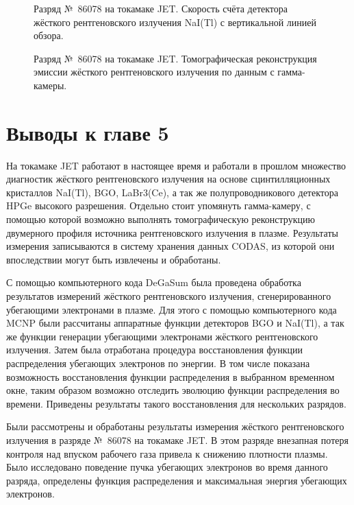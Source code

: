 \begin{figure}[ht!]
  \caption{ Разряд №~86078 на токамаке JET. Скорость счёта детектора жёсткого рентгеновского излучения NaI(Tl) с вертикальной линией обзора.~\cite{Plyusnin2015} }
  \label{fig:jetPulseHxrNaI86078}
\end{figure}

\begin{figure}[ht!]
  \caption{ Разряд №~86078 на токамаке JET. Томографическая реконструкция эмиссии жёсткого рентгеновского излучения по данным с гамма-камеры.~\cite{Plyusnin2015} }
  \label{fig:jetPulseHxrTomography86078}
\end{figure}



\FloatBarrier
\section{Выводы к главе 5}

На токамаке JET работают в настоящее время и работали в прошлом множество диагностик жёсткого рентгеновского излучения на основе сцинтилляционных кристаллов NaI(Tl), BGO, LaBr3(Ce), а так же полупроводникового детектора HPGe высокого разрешения. Отдельно стоит упомянуть гамма-камеру, с помощью которой возможно выполнять томографическую реконструкцию двумерного профиля источника рентгеновского излучения в плазме. Результаты измерения записываются в систему хранения данных CODAS, из которой они впоследствии могут быть извлечены и обработаны. 

С помощью компьютерного кода DeGaSum была проведена обработка результатов измерений жёсткого рентгеновского излучения, сгенерированного убегающими электронами в плазме. Для этого с помощью компьютерного кода MCNP были рассчитаны аппаратные функции детекторов BGO и NaI(Tl), а так же функции генерации убегающими электронами жёсткого рентгеновского излучения. Затем была отработана процедура восстановления функции распределения убегающих электронов по энергии. В том числе показана возможность восстановления функции распределения в выбранном временном окне, таким образом возможно отследить эволюцию функции распределения во времени. Приведены результаты такого восстановления для нескольких разрядов. 

Были рассмотрены и обработаны результаты измерения жёсткого рентгеновского излучения в разряде №~86078 на токамаке JET. В этом разряде внезапная потеря контроля над впуском рабочего газа привела к снижению плотности плазмы. Было исследовано поведение пучка убегающих электронов во время данного разряда, определены функция распределения и максимальная энергия убегающих электронов.


\clearpage
